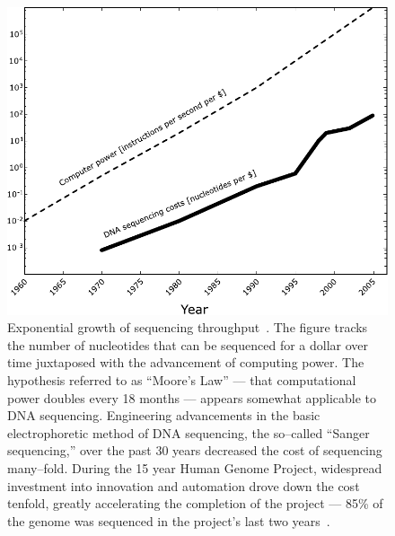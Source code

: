             \begin{figure}[ptb]
            \centering
            \includegraphics[width=\textwidth]{Body/Images-chap1/moore.pdf}
            \caption[Exponential growth of sequencing throughput]{
                Exponential growth of sequencing throughput~\cite{shendure2004advanced}.  The
                figure tracks the number of nucleotides that can be
                sequenced for a dollar over time juxtaposed with the
                advancement of computing power.  The hypothesis
                referred to as ``Moore's Law'' --- that
                computational power doubles every 18 months ---
                appears somewhat applicable to DNA sequencing.
                Engineering advancements in the basic
                electrophoretic method of DNA sequencing, the
                so--called ``Sanger sequencing,'' over the past 30 years
                decreased the cost of sequencing many--fold.  During
                the 15 year Human Genome Project, widespread
                investment into innovation and automation drove down the
                cost tenfold, greatly accelerating
                the completion of the project ---
                85\% of the genome was sequenced in the project's last
                two years~\cite{collins2003human}.
        }
            \label{fig:moore}
            \end{figure}

